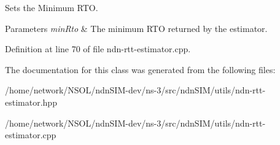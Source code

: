 Sets the Minimum R\+TO. 


\begin{DoxyParams}{Parameters}
{\em min\+Rto} & The minimum R\+TO returned by the estimator. \\
\hline
\end{DoxyParams}


Definition at line 70 of file ndn-\/rtt-\/estimator.\+cpp.



The documentation for this class was generated from the following files\+:\begin{DoxyCompactItemize}
\item 
/home/network/\+N\+S\+O\+L/ndn\+S\+I\+M-\/dev/ns-\/3/src/ndn\+S\+I\+M/utils/ndn-\/rtt-\/estimator.\+hpp\item 
/home/network/\+N\+S\+O\+L/ndn\+S\+I\+M-\/dev/ns-\/3/src/ndn\+S\+I\+M/utils/ndn-\/rtt-\/estimator.\+cpp\end{DoxyCompactItemize}
